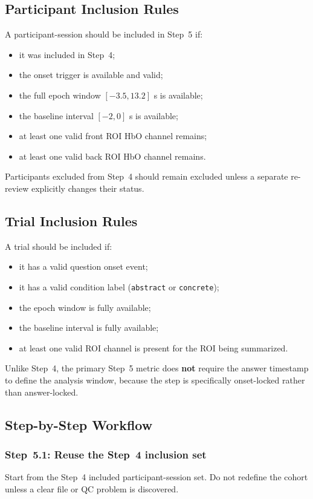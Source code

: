 \documentclass[11pt]{article}
\begin{document}
\subsection{Participant Inclusion Rules}
A participant-session should be included in Step~5 if:
\begin{itemize}
    \item it was included in Step~4;
    \item the onset trigger is available and valid;
    \item the full epoch window \([-3.5, 13.2]\) s is available;
    \item the baseline interval \([-2, 0]\) s is available;
    \item at least one valid front ROI HbO channel remains;
    \item at least one valid back ROI HbO channel remains.
\end{itemize}

Participants excluded from Step~4 should remain excluded unless a separate re-review explicitly
changes their status.

\subsection{Trial Inclusion Rules}
A trial should be included if:
\begin{itemize}
    \item it has a valid question onset event;
    \item it has a valid condition label (\texttt{abstract} or \texttt{concrete});
    \item the epoch window is fully available;
    \item the baseline interval is fully available;
    \item at least one valid ROI channel is present for the ROI being summarized.
\end{itemize}

Unlike Step~4, the primary Step~5 metric does \textbf{not} require the answer timestamp to define
the analysis window, because the step is specifically onset-locked rather than answer-locked.

\subsection{Step-by-Step Workflow}

\subsubsection{Step~5.1: Reuse the Step~4 inclusion set}
Start from the Step~4 included participant-session set.
Do not redefine the cohort unless a clear file or QC problem is discovered.
\end{document}
